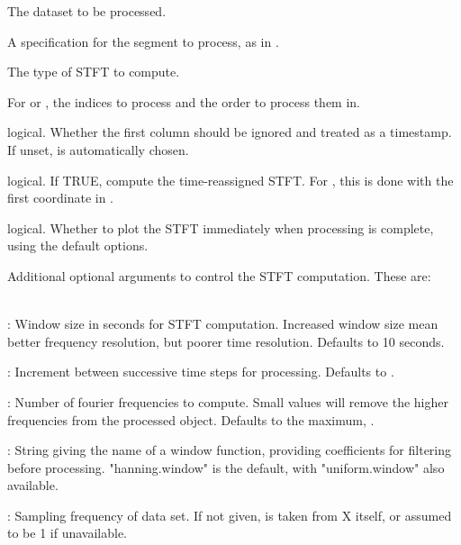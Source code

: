 \documentclass[a4paper]{book}
\begin{document}
\begin{Arguments}
\begin{ldescription}
\item[\code{X}] The dataset to be processed.
\item[\code{start, end, length, time.format}] A specification for the segment to process, as in .
\item[\code{type}] The type of STFT to compute.
\item[\code{mv.indices}] For  or , the indices to process and the order to process them in.
\item[\code{date.col}] logical. Whether the first column should be ignored and treated as a timestamp. If unset, is automatically chosen.
\item[\code{reassign}] logical. If TRUE, compute the time-reassigned STFT. For , this is done with the first coordinate in .
\item[\code{plot.it}] logical. Whether to plot the STFT immediately when processing is complete, using the default  options.
\item[\code{...}] Additional optional arguments to control the STFT computation. These are: \\{}\\{}

: Window size in seconds for STFT computation. Increased window size mean better frequency resolution, but poorer time resolution. Defaults to 10 seconds.\\{}

: Increment between successive time steps for processing. Defaults to . \\{}

: Number of fourier frequencies to compute. Small values will remove the higher frequencies from the processed object. Defaults to the maximum, .\\{}

: String giving the name of a window function, providing coefficients for filtering before processing. "hanning.window" is the default, with "uniform.window" also available.\\{}

: Sampling frequency of data set. If not given, is taken from X itself, or assumed to be 1 if unavailable.\\{}


\end{ldescription}
\end{Arguments}
\end{document}
